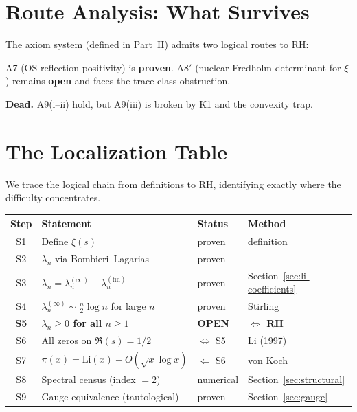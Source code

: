 \documentclass[12pt,a4paper]{article}
\theoremstyle{definition}
\theoremstyle{remark}
\begin{document}
\section{Route Analysis: What Survives}
\label{sec:routes}

The axiom system (defined in Part~II) admits two logical routes to RH:

\begin{description}[font=\bfseries,leftmargin=2em]
  \item[Route 1 (A7 + A8$'$):] A7 (OS reflection positivity) is \textbf{proven}. A8$'$ (nuclear Fredholm determinant for $\xi$) remains \textbf{open} and faces the trace-class obstruction.
  \item[Route 2 (A9):] \textbf{Dead.} A9(i--ii) hold, but A9(iii) is broken by K1 and the convexity trap.
\end{description}


\section{The Localization Table}
\label{sec:localization}

We trace the logical chain from definitions to RH, identifying exactly where the difficulty concentrates.

\begin{center}
\renewcommand{\arraystretch}{1.2}
\begin{tabular}{c|l|l|l}
\textbf{Step} & \textbf{Statement} & \textbf{Status} & \textbf{Method} \\\hline
S1 & Define $\xi(s)$ & proven & definition \\
S2 & $\lambda_n$ via Bombieri--Lagarias & proven & \cite{BombieriLagarias1999} \\
S3 & $\lambda_n = \lambda_n^{(\infty)} + \lambda_n^{(\mathrm{fin})}$ & proven & Section~\ref{sec:li-coefficients} \\
S4 & $\lambda_n^{(\infty)} \sim \frac{n}{2}\log n$ for large $n$ & proven & Stirling \\
\textbf{S5} & \textbf{$\lambda_n \geq 0$ for all $n \geq 1$} & \textbf{OPEN} & \textbf{$\Longleftrightarrow$ RH} \\
S6 & All zeros on $\Re(s) = 1/2$ & $\Leftrightarrow$ S5 & Li (1997) \\
S7 & $\pi(x) = \mathrm{Li}(x) + O(\sqrt{x}\log x)$ & $\Leftarrow$ S6 & von Koch \\
S8 & Spectral census (index $= 2$) & numerical & Section~\ref{sec:structural} \\
S9 & Gauge equivalence (tautological) & proven & Section~\ref{sec:gauge} \\
\end{tabular}
\end{center}
\end{document}
